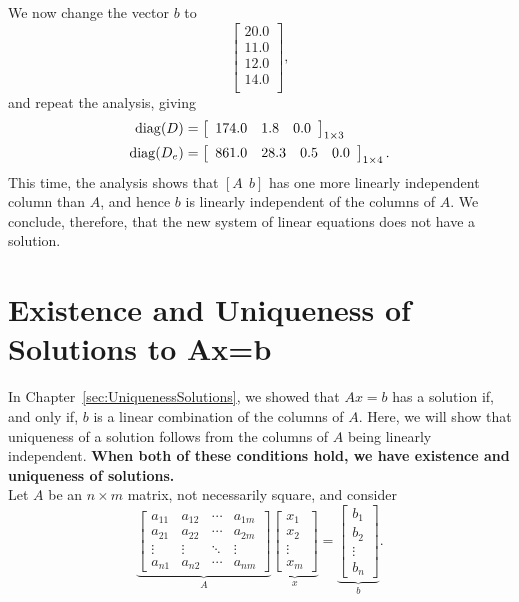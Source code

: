 We now change the vector $b$ to 
$$
\left[
\begin{array}{r}
20.0 \\
11.0 \\
12.0 \\
14.0 \\
\end{array}
\right],
$$
and repeat the analysis, giving 
\begin{align}
    \label{eq:DiagOfUB}
{\rm diag}(D)&= \left[
\begin{array}{ccc}
174.0 & 1.8 & 0.0 \\
\end{array}
\right]_{1 \times 3} \\
  \label{eq:DiagOfUeC}
{\rm diag}(D_e)&= 
\left[
\begin{array}{cccc}
861.0 & 28.3 & 0.5 & 0.0 \\
\end{array}
\right]_{1 \times 4}.
\end{align}
This time, the analysis shows that $[A~~b]$ has one more linearly independent column than $A$, and hence $b$ is linearly independent of the columns of $A$. We conclude, therefore, that the new system of linear equations does not have a solution. 
\Qed


\section{Existence and Uniqueness of Solutions to Ax=b}

In Chapter~\ref{sec:UniquenessSolutions}, we showed that $Ax=b$ has a solution if, and only if, $b$ is a linear combination of the columns of $A$. Here, we will show that uniqueness of a solution follows from the columns of $A$ being linearly independent. \textbf{When both of these conditions hold, we have existence and uniqueness of solutions.} \\

Let $A$ be an $n \times m$ matrix, not necessarily square, and consider 
\begin{equation}
\label{eq:UniquenessSolutionsNonsquare}    
 \underbrace{\left[\begin{array}{cccc} a_{11}& a_{12}& \cdots & a_{1m} \\
 a_{21}& a_{22}& \cdots & a_{2m}  \\
 \vdots & \vdots&  \ddots & \vdots \\
 a_{n1}& a_{n2}& \cdots & a_{nm} 
 \end{array}\right] }_{A} \underbrace{\left[ \begin{array}{c} x_1 \\ x_2 \\
\vdots \\ x_m   \end{array} \right]}_{x} = \underbrace{\left[ \begin{array}{c} b_1 \\ b_2 \\ \vdots \\ b_n  \end{array} \right]}_{b}.
\end{equation}

